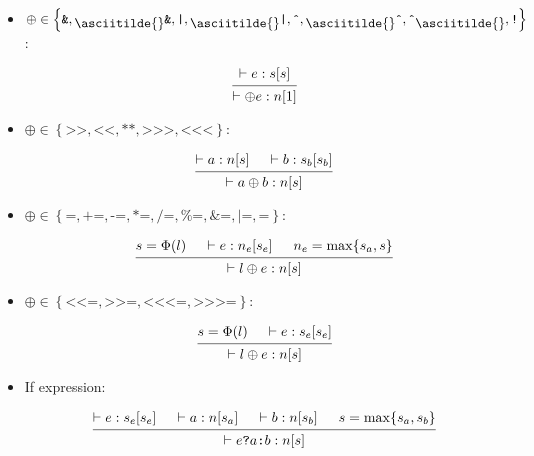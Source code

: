 \documentclass{article}
\newcommand{\mytilde}{\raisebox{-.7ex}{\asciitilde{}}}
\newcommand{\red}{\ensuremath{\left\{
      \texttt{\&}, \mytilde\texttt{\&}, \texttt{|}, \mytilde\texttt{|}, \texttt{\^{}},
      \mytilde\texttt{\^{}}, \texttt{\^{}}\mytilde, \texttt{!}
    \right\}}}
\newcommand{\shift}{\ensuremath{\left\{
      \texttt{>>}, \texttt{<}\texttt{<}, \texttt{**}, \texttt{>>>},
      \texttt{<}\texttt{<}\texttt{<}
    \right\}}}
\newcommand{\assignBinOp}{\ensuremath{\left\{
      \texttt{=}, \texttt{+=}, \texttt{-=}, \texttt{*=}, \texttt{/=},
      \texttt{\%=}, \texttt{\&=}, \texttt{|=}, \texttt{\^{}=}
    \right\}}}
\newcommand{\assignShift}{\ensuremath{\left\{
      \texttt{<}\texttt{<=}, \texttt{>>=},
      \texttt{<}\texttt{<}\texttt{<=}, \texttt{>>>=}
    \right\}}}
\newcommand{\type}[3]{\vdash#2:#1[#3]}
\begin{document}
\begin{itemize}[leftmargin=*]
    \item $\oplus \in \red$:

          \begin{equation*}
              \begin{prooftree}
                  \hypo{\type{s}{e}{s}}
                  \infer1{\type{n}{\oplus e}{1}}
              \end{prooftree}
          \end{equation*}

    \item $\oplus \in \shift$:

          \begin{equation*}
              \begin{prooftree}
                  \hypo{\type{n}{a}{s}}
                  \hypo{\type{s_b}{b}{s_b}}
                  \infer2{\type{n}{a \oplus b}{s}}
              \end{prooftree}
          \end{equation*}

    \item $\oplus \in \assignBinOp$:

          \begin{equation*}
              \begin{prooftree}
                  \hypo{s = \Phi(l)}
                  \hypo{\type{n_e}{e}{s_e}}
                  \hypo{n_e = \max\{s_a, s\}}
                  \infer3{\type{n}{l \oplus e}{s}}
              \end{prooftree}
          \end{equation*}

    \item $\oplus \in \assignShift$:

          \begin{equation*}
              \begin{prooftree}
                  \hypo{s = \Phi(l)}
                  \hypo{\type{s_e}{e}{s_e}}
                  \infer2{\type{n}{l \oplus e}{s}}
              \end{prooftree}
          \end{equation*}

    \item If expression:

          \begin{equation*}
              \begin{prooftree}
                  \hypo{\type{s_e}{e}{s_e}}
                  \hypo{\type{n}{a}{s_a}}
                  \hypo{\type{n}{b}{s_b}}
                  \hypo{s = \max\{s_a, s_b\}}
                  \infer4{\type{n}{e \texttt{?} a \texttt{:} b}{s}}
              \end{prooftree}
          \end{equation*}


\end{itemize}
\end{document}
